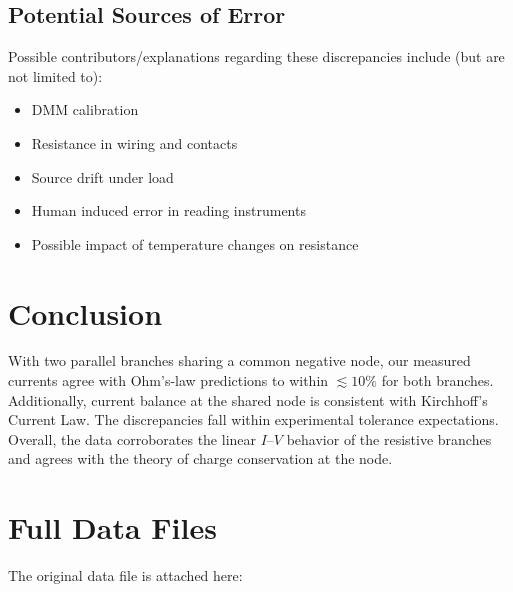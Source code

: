 \documentclass[11pt]{article}
\begin{document}
    \subsection{Potential Sources of Error}
        Possible contributors/explanations regarding these discrepancies include (but are not limited to):
        \begin{itemize}
            \item DMM calibration
            \item Resistance in wiring and contacts
            \item Source drift under load
            \item Human induced error in reading instruments
            \item Possible impact of temperature changes on resistance
        \end{itemize}

\section{Conclusion}
With two parallel branches sharing a common negative node, our measured currents agree with Ohm’s-law predictions to within \(\lesssim10\%\) for both branches.
Additionally, current balance at the shared node is consistent with Kirchhoff’s Current Law.
The discrepancies fall within experimental tolerance expectations.
Overall, the data corroborates the linear \(I\)–\(V\) behavior of the resistive branches and agrees with the theory of charge conservation at the node.

\appendix
\section{Full Data Files}
\noindent The original data file is attached here: 
\end{document}
